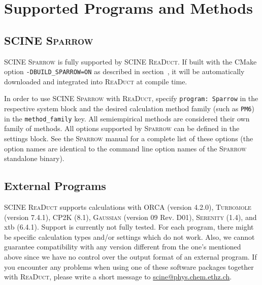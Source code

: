 \documentclass[]{tufte-book}
\begin{document}
\section{Supported Programs and Methods}

\subsection{SCINE \textsc{Sparrow}}

SCINE \textsc{Sparrow} is fully supported by SCINE \textsc{ReaDuct}. If built with the CMake option \texttt{-DBUILD\_SPARROW=ON}
as described in section~, it will be automatically downloaded and integrated into \textsc{ReaDuct}
at compile time.

In order to use SCINE \textsc{Sparrow} with \textsc{ReaDuct}, specify \texttt{program: Sparrow} in the respective system
block and the desired calculation method family (such as \texttt{PM6}) in the \texttt{method\_family} key.
All semiempirical methods are considered their own family of methods.
All options supported by \textsc{Sparrow} can be defined in the settings block. See the \textsc{Sparrow} manual for a complete
list of these options (the option names are identical to the command line option names of the \textsc{Sparrow} standalone binary).

\subsection{External Programs}

SCINE \textsc{ReaDuct} supports calculations with \textsc{ORCA}\cite{orca} (version 4.2.0), \textsc{Turbomole}\cite{turbomole} (version 7.4.1), \textsc{CP2K} (8.1)\cite{cp2k}, \textsc{Gaussian}\cite{gaussian09} (version 09 Rev. D01), \textsc{Serenity}\cite{serenity} (1.4), and xtb (6.4.1)\cite{xtb}. Support is currently not fully tested. For each program, there might be specific calculation types and/or settings which do not work. Also, we cannot guarantee compatibility with any version different from the one's mentioned above since we have no control over the output format of an external program. If you encounter any problems when
using one of these software packages together with \textsc{ReaDuct}, please write a short message to \href{scine@phys.chem.ethz.ch}{scine@phys.chem.ethz.ch}.
\end{document}
